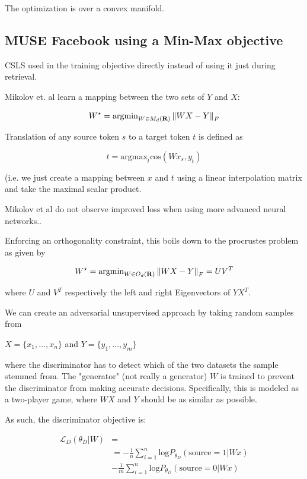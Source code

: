 \documentclass[a4paper,12pt,twoside,openright]{report}
\begin{document}
The optimization is over a convex manifold.



\subsection{MUSE Facebook using a Min-Max objective}

CSLS used in the training objective directly instead of using it just during retrieval.

Mikolov et. al learn a mapping between the two sets of $Y$ and $X$:

\begin{equation}
W^{\star} = \text{argmin}_{W \in M_d(\mathbf{R})} \left\lVert WX - Y\right\rVert_F
\end{equation}

Translation of any source token $s$ to a target token $t$ is defined as 

$$
t = \text{argmax}_t \text{cos} (Wx_s, y_t)
$$

(i.e. we just create a mapping between $x$ and $t$ using a linear interpolation matrix and take the maximal scalar product.

Mikolov et al do not observe improved loss when using more advanced neural networks..

Enforcing an orthogonality constraint, this boils down to the procrustes problem as given by

\begin{equation}
W^\star = \text{argmin}_{W \in O_d(\mathbf{R}) } \left\lVert WX - Y\right\rVert_F = UV^T 
\end{equation}

where $U$ and $V^T$ respectively the left and right Eigenvectors of $YX^T$.

We can create an adversarial unsupervised approach by taking random samples from 

$ X = \{ x_1, \dots, x_n \} $ and $ Y = \{ y_1, \dots, y_m \} $

where the discriminator has to detect which of the two datasets the sample stemmed from.
The "generator" (not really a generator) $W$ is trained to prevent the discriminator from making accurate decisions.
Specifically, this is modeled as a two-player game, where $WX$ and $Y$ should be as similar as possible.

As such, the discriminator objective is: 

\begin{align}
\mathcal{L}_D(\theta_D | W) &= \\ 
&= -\frac{1}{n} \sum_{i=1}^n \text{log} P_{\theta_D}  (\text{source} = 1 | W x ) \\ &-  \frac{1}{m} \sum_{i=1}^n \text{log} P_{\theta_D}  (\text{source} = 0 | W x )
\end{align}
\end{document}
